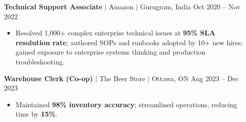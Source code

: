 \documentclass[11pt,a4paper]{article}
\begin{document}
\textbf{Technical Support Associate} $|$ Amazon $|$ Gurugram, India \hfill Oct 2020 -- Nov 2022
\begin{itemize}
    \item Resolved 1,000+ complex enterprise technical issues at \textbf{95\% SLA resolution rate}; authored SOPs and runbooks adopted by 10+ new hires; gained exposure to enterprise systems thinking and production troubleshooting.
\end{itemize}

\vspace{4pt}

\textbf{Warehouse Clerk (Co-op)} $|$ The Beer Store $|$ Ottawa, ON \hfill Aug 2023 -- Dec 2023
\begin{itemize}
    \item Maintained \textbf{98\% inventory accuracy}; streamlined operations, reducing time by \textbf{15\%}.
\end{itemize}
\end{document}
